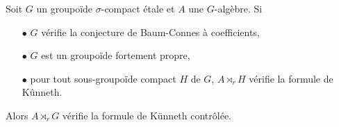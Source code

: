 \begin{thm}
Soit $G$ un groupoïde $\sigma$-compact étale et $A$ une $G$-algèbre. Si 
\begin{itemize}
\item[$\bullet$] $G$ vérifie la conjecture de Baum-Connes à coefficients,
\item[$\bullet$] $G$ est un groupoïde fortement propre,
\item[$\bullet$] pour tout sous-groupoïde compact $H$ de $G$, $A\rtimes_r H$ vérifie la formule de Kûnneth.
\end{itemize} 
Alors $A\rtimes_r G$ vérifie la formule de Künneth contrôlée.
\end{thm}


































